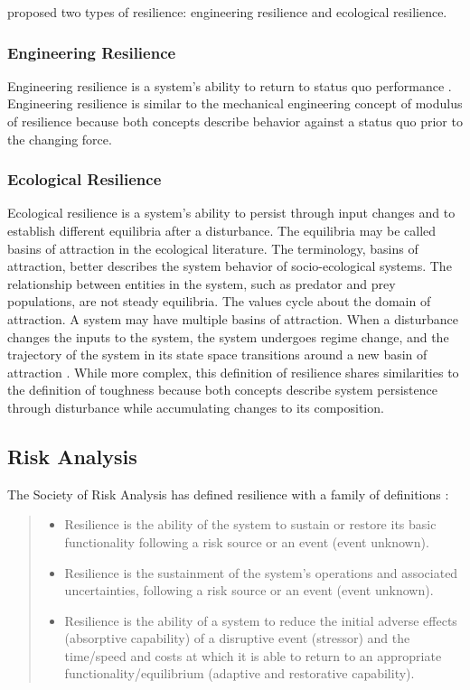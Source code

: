 \cite{Holling1973a} proposed two types of resilience: engineering
resilience and ecological resilience.

\subsubsection{Engineering Resilience}
Engineering resilience is a system's ability to return to status quo
performance \cite{Holling2010}. Engineering resilience is similar to
the mechanical engineering concept of modulus of resilience because
both concepts describe behavior against a status quo prior to the
changing force.

\subsubsection{Ecological Resilience}
Ecological resilience is a system's ability to persist through input
changes and to establish different equilibria after a disturbance. The
equilibria may be called basins of attraction in the ecological
literature. The terminology, basins of attraction, better describes
the system behavior of socio-ecological systems. The relationship
between entities in the system, such as predator and prey populations,
are not steady equilibria. The values cycle about the domain of
attraction. A system may have multiple basins of attraction. When a
disturbance changes the inputs to the system, the system undergoes
regime change, and the trajectory of the system in its state space
transitions around a new basin of attraction \cite{Folke2010a}. While
more complex, this definition of resilience shares similarities to the
definition of toughness because both concepts describe system
persistence through disturbance while accumulating changes to its
composition.

\subsection{Risk Analysis}
The Society of Risk Analysis has defined resilience with a family of
definitions \cite{Aven2015b}:
\begin{quotation}
  \begin{itemize}
    \item Resilience is the ability of the system to sustain or
      restore its basic functionality following a risk source or an
      event (event unknown).
    \item Resilience is the sustainment of the system's operations
      and associated uncertainties, following a risk source or an
      event (event unknown).
    \item Resilience is the ability of a system to reduce the initial
      adverse effects (absorptive capability) of a disruptive event
      (stressor) and the time/speed and costs at which it is able to
      return to an appropriate functionality/equilibrium (adaptive and
      restorative capability).
  \end{itemize}
\end{quotation}

